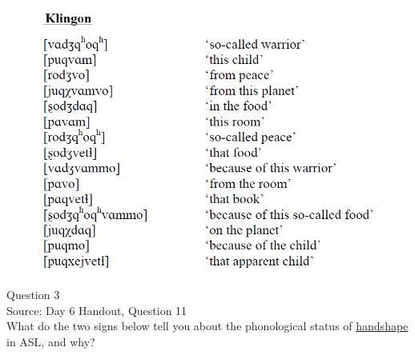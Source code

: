 \documentclass[12pt]{article}
\begin{document}
\begin{figure}[H]
\includegraphics{../images/klingon.png}
\end{figure}

\newpage

{\large Question 3}\\

Source: Day 6 Handout, Question 11\\

What do the two signs below tell you about the phonological status of \underline{handshape} in ASL, and why?\\
\end{document}

